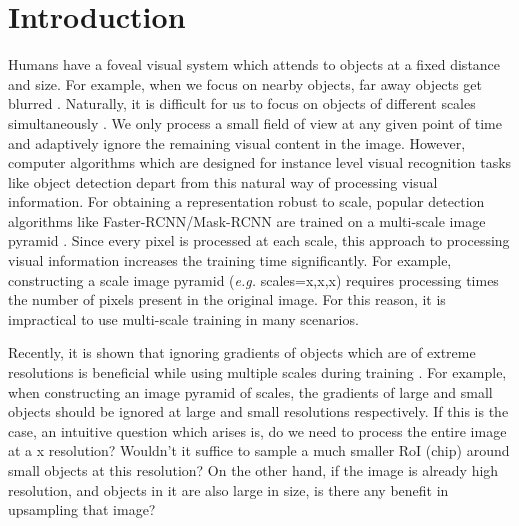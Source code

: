 \documentclass{article}
\begin{document}
\section{Introduction}
Humans have a foveal visual system which attends to objects at a fixed distance and size. For example, when we focus on nearby objects, far away objects get blurred \cite{corbetta2002control}. Naturally, it is difficult for us to focus on objects of different scales simultaneously \cite{rensink2000dynamic}. We only process a small field of view at any given point of time and adaptively ignore the remaining visual content in the image. However, computer algorithms which are designed for instance level visual recognition tasks like object detection depart from this natural way of processing visual information. For obtaining a representation robust to scale, popular detection algorithms like Faster-RCNN/Mask-RCNN \cite{ren2015faster,he2017mask} are trained on a multi-scale image pyramid \cite{liu2018path,singh2017analysis}. Since every pixel is processed at each scale, this approach to processing visual information increases the training time significantly. For example, constructing a  scale image pyramid (\textit{e.g.} scales=x,x,x) requires processing  times the number of pixels present in the original image. For this reason, it is impractical to use multi-scale training in many scenarios. 

Recently, it is shown that ignoring gradients of objects which are of extreme resolutions is beneficial while using multiple scales during training \cite{singh2017analysis}. For example, when constructing an image pyramid of  scales, the gradients of large and small objects should be ignored at large and small resolutions respectively. If this is the case, an intuitive question which arises is, do we need to process the entire image at a x resolution? Wouldn’t it suffice to sample a much smaller RoI (chip) around small objects at this resolution? On the other hand, if the image is already high resolution, and objects in it are also large in size, is there any benefit in upsampling that image? 
\end{document}
